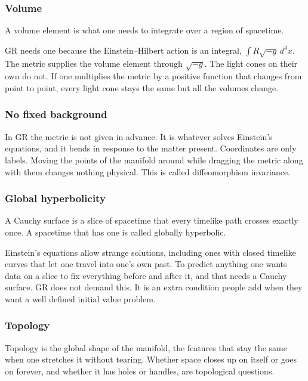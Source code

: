 \subsubsection{Volume}

A volume element is what one needs to integrate over a region of spacetime.

GR needs one because the Einstein--Hilbert action is an integral, $\int R\sqrt{-g}\,d^4x$.
The metric supplies the volume element through $\sqrt{-g}$.
The light cones on their own do not.
If one multiplies the metric by a positive function that changes from point to point, every light cone stays the same but all the volumes change.

\subsubsection{No fixed background}

In GR the metric is not given in advance.
It is whatever solves Einstein's equations, and it bends in response to the matter present.
Coordinates are only labels.
Moving the points of the manifold around while dragging the metric along with them changes nothing physical.
This is called diffeomorphism invariance.

\subsubsection{Global hyperbolicity}

A Cauchy surface is a slice of spacetime that every timelike path crosses exactly once.
A spacetime that has one is called globally hyperbolic.

Einstein's equations allow strange solutions, including ones with closed timelike curves that let one travel into one's own past.
To predict anything one wants data on a slice to fix everything before and after it, and that needs a Cauchy surface.
GR does not demand this.
It is an extra condition people add when they want a well defined initial value problem.

\subsubsection{Topology}

Topology is the global shape of the manifold, the features that stay the same when one stretches it without tearing.
Whether space closes up on itself or goes on forever, and whether it has holes or handles, are topological questions.

